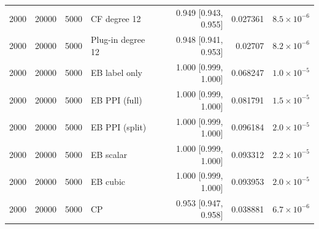 {\begin{longtable}{rrrlrrr}
2000 & 20000 & 5000 & CF degree 12 & 0.949 [0.943, 0.955] & 0.027361 & $8.5\times 10^{-6}$ \\
2000 & 20000 & 5000 & Plug-in degree 12 & 0.948 [0.941, 0.953] & 0.02707 & $8.2\times 10^{-6}$ \\
2000 & 20000 & 5000 & EB label only & 1.000 [0.999, 1.000] & 0.068247 & $1.0\times 10^{-5}$ \\
2000 & 20000 & 5000 & EB PPI (full) & 1.000 [0.999, 1.000] & 0.081791 & $1.5\times 10^{-5}$ \\
2000 & 20000 & 5000 & EB PPI (split) & 1.000 [0.999, 1.000] & 0.096184 & $2.0\times 10^{-5}$ \\
2000 & 20000 & 5000 & EB scalar & 1.000 [0.999, 1.000] & 0.093312 & $2.2\times 10^{-5}$ \\
2000 & 20000 & 5000 & EB cubic & 1.000 [0.999, 1.000] & 0.093953 & $2.0\times 10^{-5}$ \\
2000 & 20000 & 5000 & CP & 0.953 [0.947, 0.958] & 0.038881 & $6.7\times 10^{-6}$ \\
\end{longtable}}
